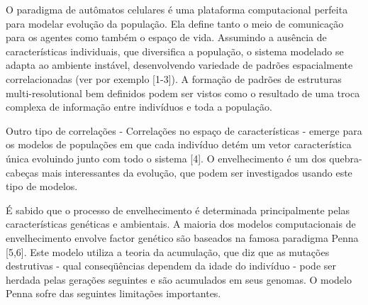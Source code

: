 \documentclass{article}
\begin{document}
O paradigma de autômatos celulares é uma plataforma computacional perfeita para modelar evolução da população. Ela define tanto o meio de comunicação para os agentes como também o espaço de vida. Assumindo a ausência de características individuais, que diversifica a população, o sistema modelado se adapta ao ambiente instável, desenvolvendo variedade de padrões espacialmente correlacionadas (ver por exemplo [1-3]). A formação de padrões de estruturas multi-resolutional bem definidos podem ser vistos como o resultado de uma troca complexa de informação entre indivíduos e toda a população.


Outro tipo de correlações - Correlações no espaço de características - emerge para os modelos de populações em que cada indivíduo detém um vetor característica única evoluindo junto com todo o sistema [4]. O envelhecimento é um dos quebra-cabeças mais interessantes da evolução, que podem ser investigados usando este tipo de modelos.


É sabido que o processo de envelhecimento é determinada principalmente pelas características genéticas e ambientais. A maioria dos modelos computacionais de envelhecimento envolve factor genético são baseados na famosa paradigma Penna [5,6]. Este modelo utiliza a teoria da acumulação, que diz que as mutações destrutivas - qual conseqüências dependem da idade do indivíduo - pode ser herdada pelas gerações seguintes e são acumulados em seus genomas. O modelo Penna sofre das seguintes limitações importantes.
\end{document}
